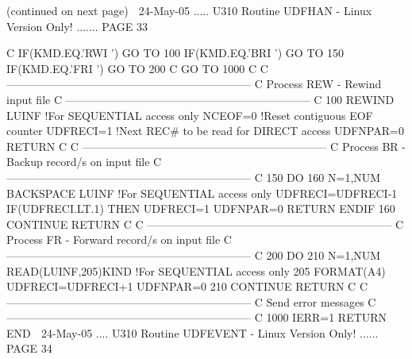  
                            (continued on next page)
    
   24-May-05 ..... U310  Routine UDFHAN - Linux Version Only! ....... PAGE  33
 
 
   C
         IF(KMD.EQ.'RWI ') GO TO 100
         IF(KMD.EQ.'BRI ') GO TO 150
         IF(KMD.EQ.'FRI ') GO TO 200
   C
         GO TO 1000
   C
   C     ------------------------------------------------------------------
   C     Process REW  -  Rewind input file
   C     ------------------------------------------------------------------
   C
     100 REWIND LUINF               !For SEQUENTIAL access only
         NCEOF=0                    !Reset contiguous EOF counter
         UDFRECI=1                  !Next REC# to be read for DIRECT access
         UDFNPAR=0
         RETURN
   C
   C     ------------------------------------------------------------------
   C     Process BR   -  Backup record/s on input file
   C     ------------------------------------------------------------------
   C
     150 DO 160 N=1,NUM
         BACKSPACE LUINF            !For SEQUENTIAL access only
         UDFRECI=UDFRECI-1
         IF(UDFRECI.LT.1) THEN
         UDFRECI=1
         UDFNPAR=0
         RETURN
         ENDIF
     160 CONTINUE
         RETURN
   C
   C     ------------------------------------------------------------------
   C     Process FR   -  Forward record/s on input file
   C     ------------------------------------------------------------------
   C
     200 DO 210 N=1,NUM
         READ(LUINF,205)KIND         !For SEQUENTIAL access only
     205 FORMAT(A4)
         UDFRECI=UDFRECI+1
         UDFNPAR=0
     210 CONTINUE
         RETURN
   C
   C     ------------------------------------------------------------------
   C     Send error messages
   C     ------------------------------------------------------------------
   C
    1000 IERR=1
         RETURN
         END
    
   24-May-05 .... U310  Routine UDFEVENT - Linux Version Only! ...... PAGE  34
 
